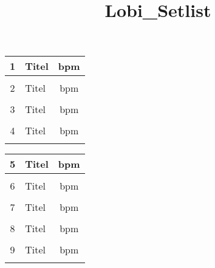 \documentclass[24pt,a4paper,oneside,final,ngerman]{scrartcl}
\title{Lobi\_Setlist}
\begin{document}
	
	
	
	
	\begin{tabular}{|c|l|c|}
		\hline
		1 & Titel & bpm \\
		\hline
		 & & \\
		\hline
		2 & Titel & bpm \\
		\hline
		& & \\
		\hline
		3 & Titel & bpm\\
		\hline
		& & \\
		\hline
		4 & Titel & bpm \\
		\hline
		& & \\
		\hline
	\end{tabular}
	
	\vspace{2cm}
	
	\begin{tabular}{|c|l|c|}
		\hline
		5 & Titel & bpm \\
		\hline
		& & \\
		\hline
		6 & Titel & bpm \\
		\hline
		& & \\
		\hline
		7 & Titel & bpm \\
		\hline
		& & \\
		\hline
		8 & Titel & bpm \\
		\hline
		& & \\
		\hline
		9 & Titel & bpm \\
		\hline
		& & \\
		\hline
	\end{tabular}
\end{document}
